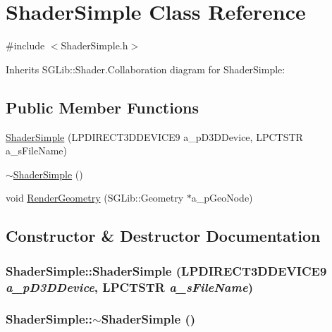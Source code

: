 \hypertarget{class_shader_simple}{
\section{ShaderSimple Class Reference}
\label{class_shader_simple}
}


{\ttfamily \#include $<$ShaderSimple.h$>$}

Inherits SGLib::Shader.Collaboration diagram for ShaderSimple:\subsection*{Public Member Functions}
\begin{DoxyCompactItemize}
\item 
\hyperlink{class_shader_simple_a4e04ff158d2c7a9de5239c103e26792e}{ShaderSimple} (LPDIRECT3DDEVICE9 a\_\-pD3DDevice, LPCTSTR a\_\-sFileName)
\item 
\hyperlink{class_shader_simple_a5360a87c84831cd589af944d003923fb}{$\sim$ShaderSimple} ()
\item 
void \hyperlink{class_shader_simple_a33f530c83a2614259c86aef8533c7450}{RenderGeometry} (SGLib::Geometry $\ast$a\_\-pGeoNode)
\end{DoxyCompactItemize}


\subsection{Constructor \& Destructor Documentation}
\hypertarget{class_shader_simple_a4e04ff158d2c7a9de5239c103e26792e}{
\subsubsection[{ShaderSimple}]{\setlength{\rightskip}{0pt plus 5cm}ShaderSimple::ShaderSimple (LPDIRECT3DDEVICE9 {\em a\_\-pD3DDevice}, \/  LPCTSTR {\em a\_\-sFileName})}}
\label{class_shader_simple_a4e04ff158d2c7a9de5239c103e26792e}
\hypertarget{class_shader_simple_a5360a87c84831cd589af944d003923fb}{
\subsubsection[{$\sim$ShaderSimple}]{\setlength{\rightskip}{0pt plus 5cm}ShaderSimple::$\sim$ShaderSimple ()}}
\label{class_shader_simple_a5360a87c84831cd589af944d003923fb}


